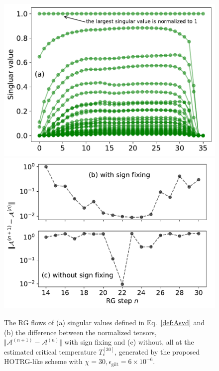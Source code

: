 \documentclass[aps,prr,reprint,superscriptaddress,nofootinbib,floatfix]{revtex4-2}
\begin{document}
\begin{figure}[tb]
    \includegraphics[width=\columnwidth]{flowA-singVal.pdf}
    \includegraphics[width=\columnwidth]{flowA-diff-compare.pdf}
    \caption{\label{fig:flowA}
        The RG flows of (a) singular values defined in Eq.~\eqref{def:Asvd} and (b) the difference between the normalized tensors, $\Vert \mathcal{A}^{(n+1)} - \mathcal{A}^{(n)} \Vert$ with sign fixing and (c) without, all at the estimated critical temperature $T_c^{[30]}$, generated by the proposed HOTRG-like scheme with $\chi = 30, \epsilon_{\text{gilt}} = 6\times 10^{-6}$.
    }
\end{figure}
\end{document}
